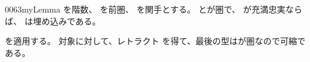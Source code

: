 \documentclass[index]{subfiles}
\begin{document}
\begin{myBlock}{0063}{myLemma}
  を階数、
  を前圏、
  を関手とする。
  とが圏で、
  が充満忠実ならば、
  は埋め込みである。
\end{myBlock}
\StartDefiningTabulars
\begin{myProof}
  を適用する。
  対象に対して、レトラクト
  を得て、最後の型はが圏なので可縮である。
\end{myProof}
\StopDefiningTabulars
\end{document}
